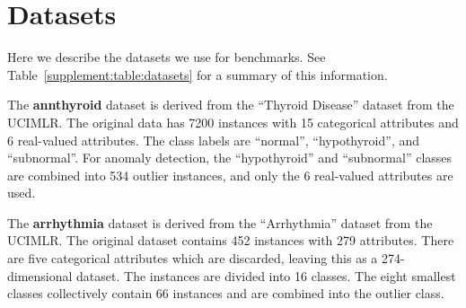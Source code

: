 








% 

\renewcommand{\thetable}{S\arabic{table}}

\renewcommand{\thefigure}{S\arabic{figure}}

\section{Datasets}
\label{supplement:sec:datasets}

Here we describe the datasets we use for benchmarks.
See Table~\ref{supplement:table:datasets} for a summary of this information.

The \textbf{annthyroid} dataset is derived from the ``Thyroid Disease'' dataset from the UCIMLR\@.
The original data has 7200 instances with 15 categorical attributes and 6 real-valued attributes.
The class labels are ``normal'', ``hypothyroid'', and ``subnormal''.
For anomaly detection, the ``hypothyroid'' and ``subnormal'' classes are combined into 534 outlier instances, and only the 6 real-valued attributes are used.

The \textbf{arrhythmia} dataset is derived from the ``Arrhythmia'' dataset from the UCIMLR\@.
The original dataset contains 452 instances with 279 attributes.
There are five categorical attributes which are discarded, leaving this as a 274-dimensional dataset.
The instances are divided into 16 classes.
The eight smallest classes collectively contain 66 instances and are combined into the outlier class.

